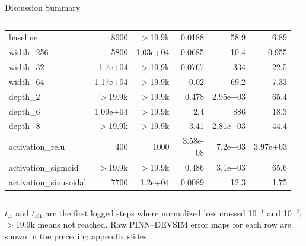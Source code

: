 \documentclass[aspectratio=169,professionalfonts]{beamer}
\begin{document}
\begin{frame}[t]{Discussion Summary}
\begin{columns}[T,onlytextwidth]
\begin{column}{0.49\textwidth}
{\begin{tabular}{lrrrrr}
\midrule
baseline & 8000 & $>$19.9k & 0.0188 & 58.9 & 6.89 \\
width\_256 & 5800 & 1.03e+04 & 0.0685 & 10.4 & 0.955 \\
width\_32 & 1.7e+04 & $>$19.9k & 0.0767 & 334 & 22.5 \\
width\_64 & 1.17e+04 & $>$19.9k & 0.02 & 69.2 & 7.33 \\
depth\_2 & $>$19.9k & $>$19.9k & 0.478 & 2.95e+03 & 65.4 \\
depth\_6 & 1.09e+04 & $>$19.9k & 2.4 & 886 & 18.3 \\
depth\_8 & $>$19.9k & $>$19.9k & 3.41 & 2.81e+03 & 44.4 \\
activation\_relu & 400 & 1000 & 3.58e-08 & 7.2e+03 & 3.97e+03 \\
activation\_sigmoid & $>$19.9k & $>$19.9k & 0.486 & 3.1e+03 & 65.6 \\
activation\_sinusoidal & 7700 & 1.2e+04 & 0.0089 & 12.3 & 1.75 \\
\bottomrule
\end{tabular}%
}
\end{column}
\begin{column}{0.49\textwidth}
\end{column}
\end{columns}
\vspace{0.015in}
{\tiny $t_{.1}$ and $t_{.01}$ are the first logged steps where normalized loss crossed 10$^{-1}$ and 10$^{-2}$; $>$19.9k means not reached. Raw PINN--DEVSIM error maps for each row are shown in the preceding appendix slides.}
\endgroup
\end{frame}
\end{document}

